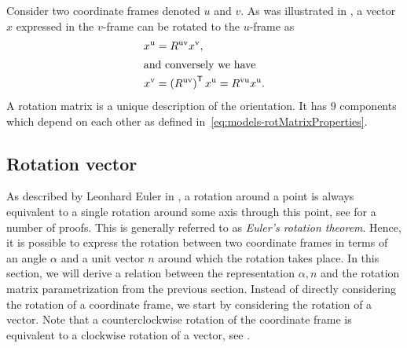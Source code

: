 Consider two coordinate frames denoted $u$ and $v$. As was illustrated in , a vector $x$ expressed in the $v$-frame can be rotated to the $u$-frame as
\begin{subequations}
\begin{align}
\label{eq:models-rotxVtoU}
x^\text{u} &= R^\text{uv} x^\text{v}, \\
\intertext{and conversely we have}
  \label{eq:models-rotxUtoV}
  x^\text{v} &= \left( R^\text{uv} \right)^{\mathsf{T}} x^\text{u} = R^\text{vu} x^\text{u}.
\end{align}
\end{subequations}
A rotation matrix is a unique description of the orientation. It has $9$ components which depend on each other as defined in~\eqref{eq:models-rotMatrixProperties}.

\subsection{Rotation vector}
As described by Leonhard Euler in \cite{euler:1775}, a rotation around a point is always equivalent to a single rotation around some axis through this point, see \cite{palaisPR:2009} for a number of proofs. This is generally referred to as \emph{Euler's rotation theorem}. Hence, it is possible to express the rotation between two coordinate frames in terms of an angle $\alpha$ and a unit vector $n$ around which the rotation takes place. In this section, we will derive a relation between the representation $\alpha, n$ and the rotation matrix parametrization from the previous section. Instead of directly considering the rotation of a coordinate frame, we start by considering the rotation of a vector. Note that a counterclockwise rotation of the coordinate frame is equivalent to a clockwise rotation of a vector, see .

